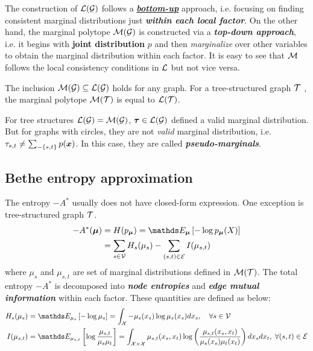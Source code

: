 \documentclass[11pt]{article}
\begin{document}
The construction of ${\mathcal L}({\mathcal G})$ follows a \underline{\textbf{\emph{bottom-up}}} approach, i.e. focusing on finding consistent marginal distributions just \emph{\textbf{within each local factor}}. On the other hand, the marginal polytope ${\mathcal M}({\mathcal G})$ is constructed via a \emph{\textbf{top-down approach}}, i.e. it begins with \textbf{joint distribution} $p$ and then \emph{marginalize} over other variables to obtain the marginal distribution within each factor. It is easy to see that ${\mathcal M}$ follows the local consistency conditions in ${\mathcal L}$ but not vice versa.

\begin{proposition}
The inclusion ${\mathcal M}({\mathcal G}) \subseteq {\mathcal L}({\mathcal G})$ holds for any graph. For a tree-structured graph ${\mathcal T}$ , the marginal polytope ${\mathcal M}({\mathcal T})$ is equal to ${\mathcal L}({\mathcal T})$.
\end{proposition} 

For tree structures ${\mathcal L}({\mathcal G}) = {\mathcal M}({\mathcal G})$, $\boldsymbol{\tau} \in {\mathcal L}({\mathcal G})$ defined a valid marginal distribution. But for graphs with circles, they are not \emph{valid} marginal distribution, i.e. $\tau_{s,t} \neq \sum_{-\{s,t\}}p(\boldsymbol{x})$. In this case, they are called \textbf{\emph{pseudo-marginals}}.
\subsection{Bethe entropy approximation}
The  entropy $-A^{*}$ usually does not have closed-form expression. One exception is tree-structured graph ${\mathcal T}$. 
\begin{align}
-A^{*}(\mb{\mu})  &= H(p_{\mb{\mu}}) = \E{\mb{\mu}}{-\log p_{\mb{\mu}}(X)} \nonumber\\
&= \sum_{s \in \cV}H_{s}(\mu_{s}) - \sum_{(s,t) \in \cE}I(\mu_{s,t}) \label{eqn: entropy_decomposition}
\end{align} where $\mu_{s}$ and $\mu_{s,t}$ are set of marginal distributions defined in ${\mathcal M}({\mathcal T})$. The total entropy $-A^{*}$ is decomposed into  \textbf{\emph{node entropies}} and \textbf{\emph{edge mutual information}} within each factor. These quantities are defined as below: 
\begin{align}
H_{s}(\mu_{s}) &= \E{\mu_{s}}{- \log \mu_{s}} = \int_{\cX} - \mu_{s}(x_s) \log \mu_{s}(x_s) d x_s, \quad \forall s\in \cV \label{eqn: node_entropy}\\
I(\mu_{s,t}) &= \E{\mu_{s,t}}{\log \frac{\mu_{s,t}}{\mu_{s} \mu_{t}}} = \int_{\cX\times \cX}\mu_{s,t}(x_s, x_t) \log\paren{\frac{\mu_{s,t}(x_s, x_t)}{\mu_{s}(x_s) \mu_{t}(x_t)}} d x_s d x_t, \; \forall (s,t) \in \cE \label{eqn: edge_mutual_information}
\end{align}
\end{document}
